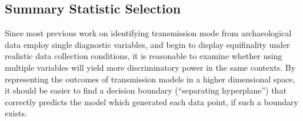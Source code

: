 \subsection{Summary Statistic Selection}\label{ctmixtures:sec:variable-selection}

Since most previous work on identifying transmission mode from archaeological data employ single diagnostic variables, and begin to display equifinality under realistic data collection conditions, it is reasonable to examine whether using multiple variables will yield more discriminatory power in the same contexts.  By representing the outcomes of transmission models in a higher dimensional space, it should be easier to find a decision boundary (``separating hyperplane'') that correctly predicts the model which generated each data point, if such a boundary exists.  

